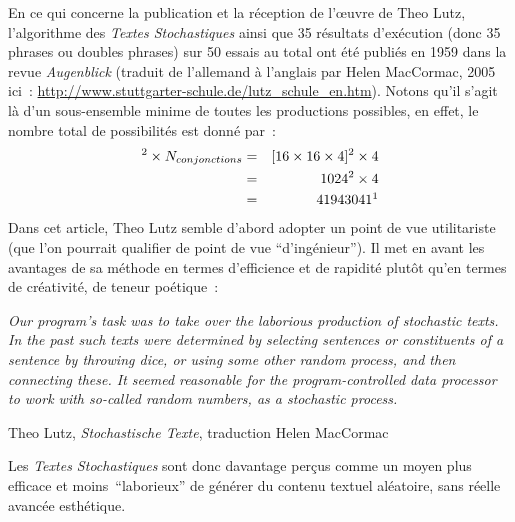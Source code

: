 \documentclass{article}
\newenvironment{citationbox}
{\begin{center}
		\begin{minipage}{.8\textwidth}
		}
		{
		\end{minipage}	
\end{center}
}
\begin{document}
				En ce qui concerne la publication et la réception de l'œuvre de Theo Lutz, l'algorithme des \textit{Textes Stochastiques} ainsi que 35 résultats d'exécution (donc 35 phrases ou doubles phrases) sur 50 essais au total ont été publiés en 1959 dans la revue \cite{lutz1959} \textit{Augenblick} (traduit de l'allemand à l'anglais par Helen MacCormac, 2005 ici : \href{http://www.stuttgarter-schule.de/lutz_schule_en.htm}{http://www.stuttgarter-schule.de/lutz\_schule\_en.htm}). Notons qu'il s'agit là d'un sous-ensemble minime de toutes les productions possibles, en effet, le nombre total de possibilités est donné par : 
				\begin{eqnarray*}
					[N_{Noms} \times N_{adjectifs} \times N_{Phrases}]^2 \times N_{conjonctions} &=& [16 \times 16 \times 4]^2 \times 4\\
					&=& 1024^2 \times 4\\
					&=& 41943041 \footnotemark \\
				\end{eqnarray*}	
				Dans cet article, Theo Lutz semble d'abord adopter un point de vue utilitariste (que  l'on pourrait qualifier de point de vue ``d'ingénieur''). Il met en avant les avantages de sa méthode en termes d'efficience et de rapidité plutôt qu'en termes de créativité, de teneur poétique :
				\begin{citationbox}
					\textit{Our program's task was to take over the laborious production of stochastic texts. In the past such texts were determined by selecting sentences or constituents of a sentence by throwing dice, or using some other random process, and then connecting these. It seemed reasonable for the program-controlled data processor to work with so-called random numbers, as a stochastic process.}
					\begin{flushright}
						Theo Lutz, \textit{Stochastische Texte}, traduction Helen MacCormac \cite{lutz1959}
					\end{flushright}
				\end{citationbox}
				Les \textit{Textes Stochastiques} sont donc davantage perçus comme un moyen plus efficace et moins ``laborieux'' de générer du contenu textuel aléatoire, sans réelle avancée esthétique.\\
				
\end{document}

